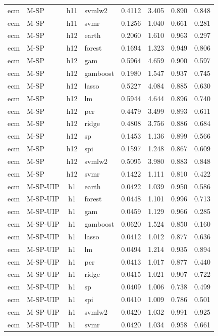 \begin{ThreePartTable}
\begin{longtable}[t]{llclcccc}
ecm & M-SP & h11 & svmlw2 & 0.4112 & 3.405 & 0.890 & 0.848\\
ecm & M-SP & h11 & svmr & 0.1256 & 1.040 & 0.661 & 0.281\\
\addlinespace
ecm & M-SP & h12 & earth & 0.2060 & 1.610 & 0.963 & 0.297\\
ecm & M-SP & h12 & forest & 0.1694 & 1.323 & 0.949 & 0.806\\
ecm & M-SP & h12 & gam & 0.5964 & 4.659 & 0.900 & 0.597\\
ecm & M-SP & h12 & gamboost & 0.1980 & 1.547 & 0.937 & 0.745\\
ecm & M-SP & h12 & lasso & 0.5227 & 4.084 & 0.885 & 0.630\\
ecm & M-SP & h12 & lm & 0.5944 & 4.644 & 0.896 & 0.740\\
ecm & M-SP & h12 & pcr & 0.4479 & 3.499 & 0.893 & 0.611\\
ecm & M-SP & h12 & ridge & 0.4808 & 3.756 & 0.886 & 0.684\\
ecm & M-SP & h12 & sp & 0.1453 & 1.136 & 0.899 & 0.566\\
ecm & M-SP & h12 & spi & 0.1597 & 1.248 & 0.867 & 0.609\\
ecm & M-SP & h12 & svmlw2 & 0.5095 & 3.980 & 0.883 & 0.848\\
ecm & M-SP & h12 & svmr & 0.1422 & 1.111 & 0.810 & 0.422\\
\addlinespace
ecm & M-SP-UIP & h1 & earth & 0.0422 & 1.039 & 0.950 & 0.586\\
ecm & M-SP-UIP & h1 & forest & 0.0448 & 1.101 & 0.996 & 0.713\\
ecm & M-SP-UIP & h1 & gam & 0.0459 & 1.129 & 0.966 & 0.285\\
ecm & M-SP-UIP & h1 & gamboost & 0.0620 & 1.524 & 0.850 & 0.160\\
ecm & M-SP-UIP & h1 & lasso & 0.0412 & 1.012 & 0.877 & 0.636\\
ecm & M-SP-UIP & h1 & lm & 0.0494 & 1.214 & 0.935 & 0.894\\
ecm & M-SP-UIP & h1 & pcr & 0.0413 & 1.017 & 0.877 & 0.440\\
ecm & M-SP-UIP & h1 & ridge & 0.0415 & 1.021 & 0.907 & 0.722\\
ecm & M-SP-UIP & h1 & sp & 0.0409 & 1.006 & 0.738 & 0.499\\
ecm & M-SP-UIP & h1 & spi & 0.0410 & 1.009 & 0.786 & 0.501\\
ecm & M-SP-UIP & h1 & svmlw2 & 0.0420 & 1.032 & 0.991 & 0.925\\
ecm & M-SP-UIP & h1 & svmr & 0.0420 & 1.034 & 0.958 & 0.661\\

\end{longtable}
\end{ThreePartTable}
